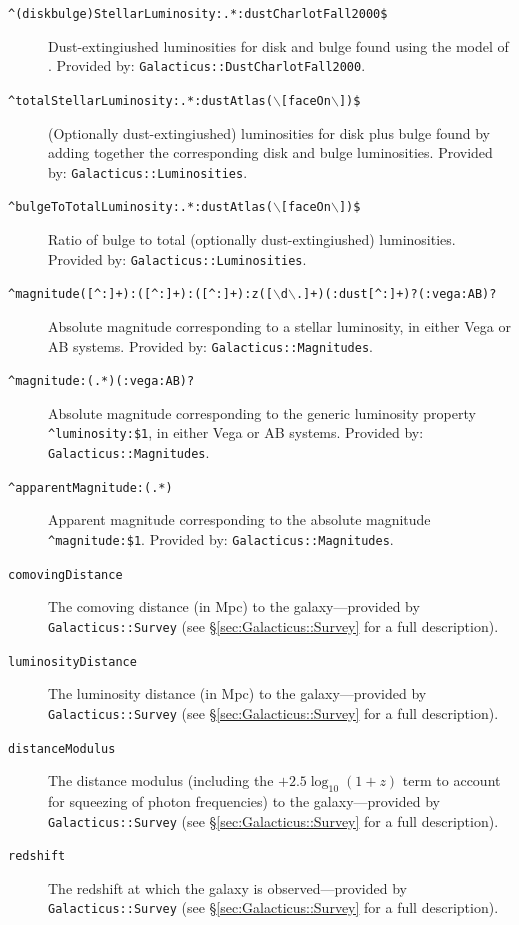 \begin{description}
 \item[{\tt \textasciicircum(disk\textbar bulge)StellarLuminosity:.*:dustCharlotFall2000\$}] Dust-extingiushed luminosities for disk and bulge found using the model of \cite{charlot_simple_2000}. Provided by: {\tt Galacticus::DustCharlotFall2000}.
 \item[{\tt \textasciicircum totalStellarLuminosity:.*:dustAtlas($\backslash$[faceOn$\backslash$])\$}] (Optionally dust-extingiushed) luminosities for disk plus bulge found by adding together the corresponding disk and bulge luminosities. Provided by: {\tt Galacticus::Luminosities}.
 \item[{\tt \textasciicircum bulgeToTotalLuminosity:.*:dustAtlas($\backslash$[faceOn$\backslash$])\$}] Ratio of bulge to total (optionally dust-extingiushed) luminosities. Provided by: {\tt Galacticus::Luminosities}.
 \item[{\tt \textasciicircum magnitude([\textasciicircum :]+):([\textasciicircum :]+):([\textasciicircum :]+):z([$\backslash$d$\backslash$.]+)(:dust[\textasciicircum :]+)?(:vega\textbar :AB)?}] Absolute magnitude corresponding to a stellar luminosity, in either Vega or AB systems. Provided by: {\tt Galacticus::Magnitudes}.
 \item[{\tt \textasciicircum magnitude:(.*)(:vega\textbar :AB)?}] Absolute magnitude corresponding to the generic luminosity property {\tt \textasciicircum luminosity:\$1}, in either Vega or AB systems. Provided by: {\tt Galacticus::Magnitudes}.
 \item[{\tt \textasciicircum apparentMagnitude:(.*)}] Apparent magnitude corresponding to the absolute magnitude {\tt \textasciicircum magnitude:\$1}. Provided by: {\tt Galacticus::Magnitudes}.
 \item[{\tt comovingDistance}] The comoving distance (in Mpc) to the galaxy---provided by {\tt Galacticus::Survey} (see \S\ref{sec:Galacticus::Survey} for a full description).
 \item[{\tt luminosityDistance}] The luminosity distance (in Mpc) to the galaxy---provided by {\tt Galacticus::Survey} (see \S\ref{sec:Galacticus::Survey} for a full description).
 \item[{\tt distanceModulus}] The distance modulus (including the $+2.5\log_{10}(1+z)$ term to account for squeezing of photon frequencies) to the galaxy---provided by {\tt Galacticus::Survey} (see \S\ref{sec:Galacticus::Survey} for a full description).
 \item[{\tt redshift}] The redshift at which the galaxy is observed---provided by {\tt Galacticus::Survey} (see \S\ref{sec:Galacticus::Survey} for a full description).

\end{description}
